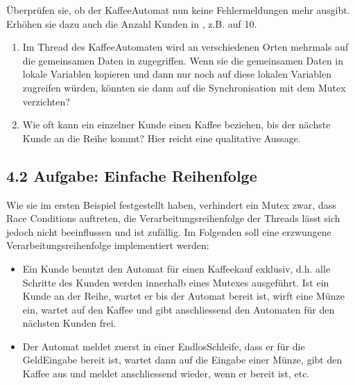 \documentclass[a4paper,10pt,english]{report}
\begin{document}
\begin{sphinxVerbatim}[commandchars=\\\{\}]
  
\end{sphinxVerbatim}

\sphinxAtStartPar
Überprüfen sie, ob der Kaffee\sphinxhyphen{}Automat nun keine Fehlermeldungen mehr ausgibt. Erhö\sphinxhyphen{}hen sie dazu auch die Anzahl Kunden  in , z.B. auf 10.
\begin{enumerate}
%
\item {} 
\sphinxAtStartPar
Im Thread des Kaffee\sphinxhyphen{}Automaten wird an verschiedenen Orten mehrmals auf die gemeinsamen Daten in  zugegriffen. Wenn sie die gemeinsamen Daten in lokale Variablen kopieren und dann nur noch auf diese lokalen Variablen zugreifen würden, könn\sphinxhyphen{}ten sie dann auf die Synchronisation mit dem Mutex verzichten?

\item {} 
\sphinxAtStartPar
Wie oft kann ein einzelner Kunde einen Kaffee beziehen, bis der nächste Kunde an die Reihe kommt? Hier reicht eine qualitative Aussage.

\end{enumerate}


\subsection{4.2 Aufgabe: Einfache Reihenfolge}
\label{\detokenize{P08_Sync/README:aufgabe-einfache-reihenfolge}}
\sphinxAtStartPar
Wie sie im ersten Beispiel festgestellt haben, verhindert ein Mutex zwar, dass Race Conditions auftreten, die Verarbeitungsreihenfolge der Threads lässt sich jedoch nicht beeinflussen und ist zufällig.
Im Folgenden soll eine erzwungene Verarbeitungsreihenfolge implementiert werden:
\begin{itemize}
\item {} 
\sphinxAtStartPar
Ein Kunde benutzt den Automat für einen Kaffeekauf exklusiv, d.h. alle Schritte des Kunden werden innerhalb eines Mutexes ausgeführt. Ist ein Kunde an der Reihe, wartet er bis der Automat bereit ist, wirft eine Münze ein, wartet auf den Kaffee und gibt anschlies\sphinxhyphen{}send den Automaten für den nächsten Kunden frei.

\item {} 
\sphinxAtStartPar
Der Automat meldet zuerst in einer Endlos\sphinxhyphen{}Schleife, dass er für die Geld\sphinxhyphen{}Eingabe bereit ist, wartet dann auf die Eingabe einer Münze, gibt den Kaffee aus und meldet anschliessend wieder, wenn er bereit ist, etc.

\end{itemize}
\end{document}
